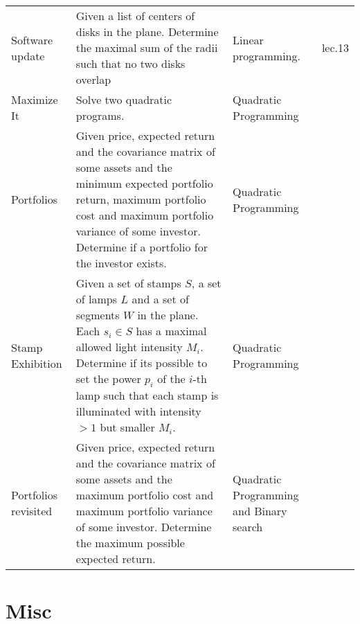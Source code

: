 \documentclass[a4paper, 10pt]{article}
\let\stdsection\section
\renewcommand\section{\newpage\stdsection}
\begin{document}
\begin{longtable}{ L{2cm} L{8cm} L{4cm} r}
        Software update 
        & Given a list of centers of disks in the plane. Determine the maximal sum of the radii such that no two disks overlap
        & Linear programming. & lec.13 \\



        Maximize It
        & Solve two quadratic programs. 
        & Quadratic Programming &  \pageref{sec:maximize_it} \\

        Portfolios 
        & Given price, expected return and the covariance matrix of some assets 
            and the minimum expected portfolio return, maximum portfolio cost  and maximum portfolio variance of some investor. 
            Determine if a portfolio for the investor exists.
        & Quadratic Programming &  \pageref{sec:portfolios} \\

        Stamp Exhibition 
        & Given a set of stamps $S$, a set of lamps $L$ and a set of segments $W$ in the plane. 
            Each $s_i\in S$ has a maximal allowed light intensity $M_i$. Determine if its possible to 
            set the power $p_i$ of the $i$-th lamp such that each stamp is illuminated with intensity $> 1$ 
            but smaller $M_i$.
        & Quadratic Programming &  \pageref{sec:stamp_exhibition} \\

        Portfolios revisited 
        & Given price, expected return and the covariance matrix of some assets 
            and the maximum portfolio cost and maximum portfolio variance of some investor. 
            Determine the maximum possible expected return.
            & Quadratic Programming and Binary search &  \pageref{sec:portfolios_revisited} \\




    \end{longtable}    


    \section{Misc}
\end{document}
